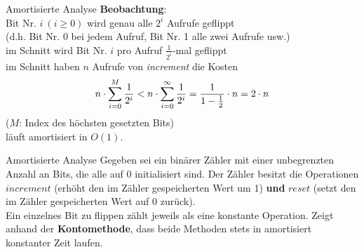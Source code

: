 \begin{frame}{Amortisierte Analyse}
	\solutionheading \smallskip
	\textbf{Beobachtung}: \\
	Bit Nr. $i\ (i \geq 0)$ wird genau alle $2^i$ Aufrufe geflippt \\
	{\small \hanging (d.h. Bit Nr. 0 bei jedem Aufruf, Bit Nr. 1 alle zwei Aufrufe usw.)} \\
	\pause
	\impl im Schnitt wird Bit Nr. $i$ pro Aufruf $\frac{1}{2^i}$-mal geflippt \\
	\pause
	\impl im Schnitt haben $n$ Aufrufe von \textit{increment} die Kosten \[
		n \cdot \sum\limits_{i=0}^{M} \frac{1}{2^i} < n \cdot \sum\limits_{i=0}^{\infty} \frac{1}{2^i} = 
		\frac{1}{1-\fract 1/2 } \* n = 2 \cdot n
	\] ($M$: Index des höchsten gesetzten Bits) \\
	\pause
	\impl läuft amortisiert in $O(1)$.
\end{frame}



\begin{frame}{Amortisierte Analyse}
	Gegeben sei ein binärer Zähler mit einer unbegrenzten Anzahl an Bits, die alle auf 0 initialisiert sind. Der Zähler besitzt die Operationen $increment$ (erhöht den im Zähler gespeicherten Wert um 1) \textbf{und} $reset$ (setzt den im Zähler gespeicherten Wert auf 0 zurück). \\
	\smallskip
	Ein einzelnes Bit zu flippen zählt jeweils als eine konstante Operation. Zeigt anhand der \textbf{Kontomethode}, dass beide Methoden stets in amortisiert konstanter Zeit laufen.
\end{frame}


